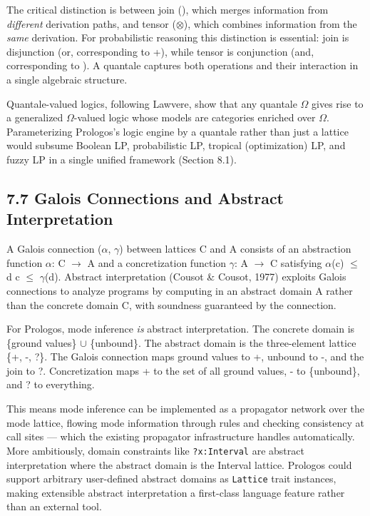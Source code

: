 \documentclass[11pt]{article}
\begin{document}
The critical distinction is between join (\bigvee), which merges information from \emph{different} derivation paths, and tensor (\(\otimes\)), which combines information from the \emph{same} derivation. For probabilistic reasoning this distinction is essential: join is disjunction (or, corresponding to +), while tensor is conjunction (and, corresponding to \texttimes{}). A quantale captures both operations and their interaction in a single algebraic structure.

Quantale-valued logics, following Lawvere, show that any quantale \(\Omega\) gives rise to a generalized \(\Omega\)-valued logic whose models are categories enriched over \(\Omega\). Parameterizing Prologos's logic engine by a quantale rather than just a lattice would subsume Boolean LP, probabilistic LP, tropical (optimization) LP, and fuzzy LP in a single unified framework (Section 8.1).
\subsection{7.7 Galois Connections and Abstract Interpretation}
\label{sec:orgde0f049}

A Galois connection (\(\alpha\), \(\gamma\)) between lattices C and A consists of an abstraction function \(\alpha\): C \(\to\) A and a concretization function \(\gamma\): A \(\to\) C satisfying \(\alpha\)(c) \(\le\) d \iff c \(\le\) \(\gamma\)(d). Abstract interpretation (Cousot \& Cousot, 1977) exploits Galois connections to analyze programs by computing in an abstract domain A rather than the concrete domain C, with soundness guaranteed by the connection.

For Prologos, mode inference \emph{is} abstract interpretation. The concrete domain is \{ground values\} \(\cup\) \{unbound\}. The abstract domain is the three-element lattice \{+, -, ?\}. The Galois connection maps ground values to +, unbound to -, and the join to ?. Concretization maps + to the set of all ground values, - to \{unbound\}, and ? to everything.

This means mode inference can be implemented as a propagator network over the mode lattice, flowing mode information through rules and checking consistency at call sites --- which the existing propagator infrastructure handles automatically. More ambitiously, domain constraints like \texttt{?x:Interval} are abstract interpretation where the abstract domain is the Interval lattice. Prologos could support arbitrary user-defined abstract domains as \texttt{Lattice} trait instances, making extensible abstract interpretation a first-class language feature rather than an external tool.
\end{document}
